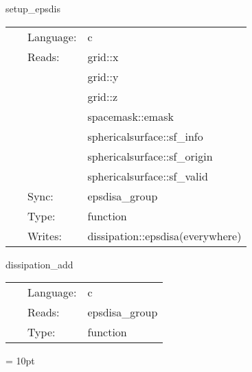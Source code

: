 \vspace{5mm}


\hspace{5mm} setup\_epsdis 

\hspace{5mm}{\it setup spatially varying dissipation } 


\hspace{5mm}

 \begin{tabular*}{160mm}{cll} 
~ & Language:  & c \\ 
~ & Reads:  & grid::x \\ 
~& ~ &grid::y\\ 
~& ~ &grid::z\\ 
~& ~ &spacemask::emask\\ 
~& ~ &sphericalsurface::sf\_info\\ 
~& ~ &sphericalsurface::sf\_origin\\ 
~& ~ &sphericalsurface::sf\_valid\\ 
~ & Sync:  & epsdisa\_group \\ 
~ & Type:  & function \\ 
~ & Writes:  & dissipation::epsdisa(everywhere) \\ 
\end{tabular*} 


\vspace{5mm}


\hspace{5mm} dissipation\_add 

\hspace{5mm}{\it add kreiss-oliger dissipation to the right hand sides } 


\hspace{5mm}

 \begin{tabular*}{160mm}{cll} 
~ & Language:  & c \\ 
~ & Reads:  & epsdisa\_group \\ 
~ & Type:  & function \\ 
\end{tabular*} 



\vspace{5mm}\parskip = 10pt 


